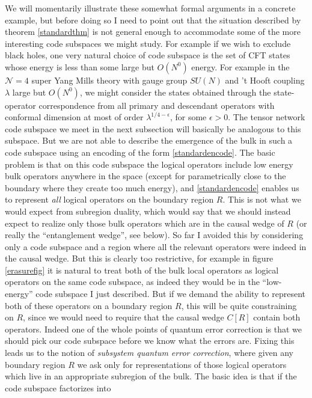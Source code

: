 \documentclass[toc]{PoS}
\begin{document}
We will momentarily illustrate these somewhat formal arguments in a concrete example, but before doing so I need to point out that the situation described by theorem \ref{standardthm} is not general enough to accommodate some of the more interesting code subspaces we might study.  For example if we wish to exclude black holes, one very natural choice of code subspace is the set of CFT states whose energy is less than some large but $O(N^0)$ energy. For example in the $\mathcal{N}=4$ super Yang Mills theory with gauge group $SU(N)$ and 't Hooft coupling $\lambda$ large but $O(N^0)$, we might consider the states obtained through the state-operator correspondence from all primary and descendant operators with conformal dimension at most of order $\lambda^{1/4-\epsilon}$, for some $\epsilon>0$.  The tensor network code subspace we meet in the next subsection will basically be analogous to this subspace.  But we are not able to describe the emergence of the bulk in such a code subspace using an encoding of the form \eqref{standardencode}.  The basic problem is that on this code subspace the logical operators include low energy bulk operators anywhere in the space (except for parametrically close to the boundary where they create too much energy), and \eqref{standardencode} enables us to represent \textit{all} logical operators on the boundary region $R$.  This is not what we would expect from subregion duality, which would say that we should instead expect to realize only those bulk operators which are in the causal wedge of $R$ (or really the ``entanglement wedge'', see below).  So far I avoided this by considering only a code subspace and a region where all the relevant operators were indeed in the causal wedge.  But this is clearly too restrictive, for example in figure \ref{erasurefig} it is natural to treat both of the bulk local operators as logical operators on the same code subspace, as indeed they would be in the ``low-energy'' code subspace I just described.  But if we demand the ability to represent both of these operators on a boundary region $R$, this will be quite constraining on $R$, since we would need to require that the causal wedge $C[R]$ contain both operators.  Indeed one of the whole points of quantum error correction is that we should pick our code subspace before we know what the errors are.  Fixing this leads us to the notion of \textit{subsystem quantum error correction}, where given any boundary region $R$ we ask only for representations of those logical operators which live in an appropriate subregion of the bulk.  The basic idea is that if the code subspace factorizes into 
\end{document}
